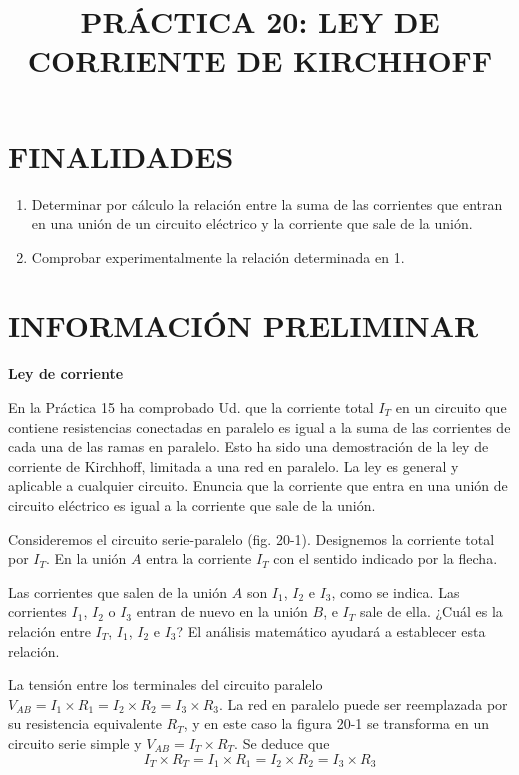\documentclass[a4paper, 12pt]{article}
\title{PRÁCTICA 20: LEY DE CORRIENTE DE KIRCHHOFF}
\author{}
\date{}
\begin{document}
\maketitle

\section*{FINALIDADES}
\begin{enumerate}
    \item Determinar por cálculo la relación entre la suma de las corrientes que entran en una unión de un circuito eléctrico y la corriente que sale de la unión.
    \item Comprobar experimentalmente la relación determinada en 1.
\end{enumerate}

\section*{INFORMACIÓN PRELIMINAR}
\textbf{Ley de corriente}

En la Práctica 15 ha comprobado Ud. que la corriente total \( I_T \) en un circuito que contiene resistencias conectadas en paralelo es igual a la suma de las corrientes de cada una de las ramas en paralelo. Esto ha sido una demostración de la ley de corriente de Kirchhoff, limitada a una red en paralelo. La ley es general y aplicable a cualquier circuito. Enuncia que la corriente que entra en una unión de circuito eléctrico es igual a la corriente que sale de la unión.

Consideremos el circuito serie-paralelo (fig. 20-1). Designemos la corriente total por \( I_T \). En la unión \( A \) entra la corriente \( I_T \) con el sentido indicado por la flecha.

Las corrientes que salen de la unión \( A \) son \( I_1 \), \( I_2 \) e \( I_3 \), como se indica. Las corrientes \( I_1 \), \( I_2 \) o \( I_3 \) entran de nuevo en la unión \( B \), e \( I_T \) sale de ella. ¿Cuál es la relación entre \( I_T \), \( I_1 \), \( I_2 \) e \( I_3 \)? El análisis matemático ayudará a establecer esta relación.

La tensión entre los terminales del circuito paralelo \( V_{AB} = I_1 \times R_1 = I_2 \times R_2 = I_3 \times R_3 \). La red en paralelo puede ser reemplazada por su resistencia equivalente \( R_T \), y en este caso la figura 20-1 se transforma en un circuito serie simple y \( V_{AB} = I_T \times R_T \). Se deduce que
\[
    I_T \times R_T = I_1 \times R_1 = I_2 \times R_2 = I_3 \times R_3
    \tag{20-1}
\]
\end{document}
